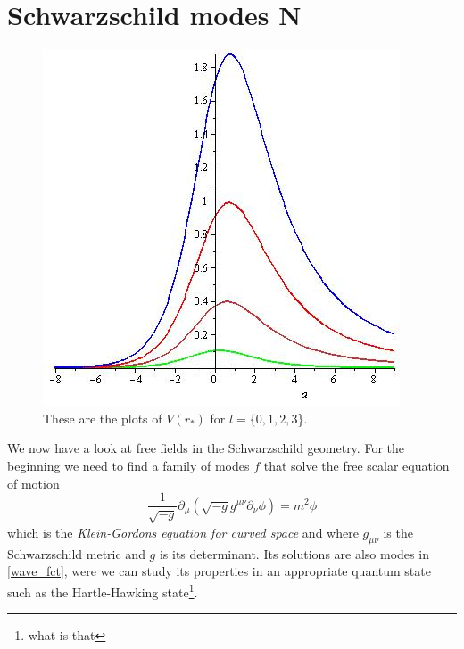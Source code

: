 \section{Schwarzschild modes \textbf{N}}
	\begin{figure} [tbp]
		\begin{center}
			\includegraphics[scale=0.5]{plots_of_V}
			\caption{These are the plots of $V(r_*)$ for $l=\{0,1,2,3$\}.} \label{plots_of_V}
		\end{center}
	\end{figure} 

	We now have a look at free fields in the Schwarzschild geometry. For the beginning we need to find a family of modes $f$ that solve the free scalar equation of motion
		\begin{equation} \label{Klein_Gordon_curved}
			\frac{1}{\sqrt{-g}} \partial_\mu (\sqrt{-g} g^{\mu \nu} \partial_\nu \phi)
			= m^2 \phi
		\end{equation}
	which is the \textit{Klein-Gordons equation for curved space} and where $g_{\mu\nu}$ is the Schwarzschild metric and $g$ is its determinant. Its solutions are also modes in \eqref{wave_fct}, were we can study its properties in an appropriate quantum state such as the Hartle-Hawking state\footnote{what is that}.
	
